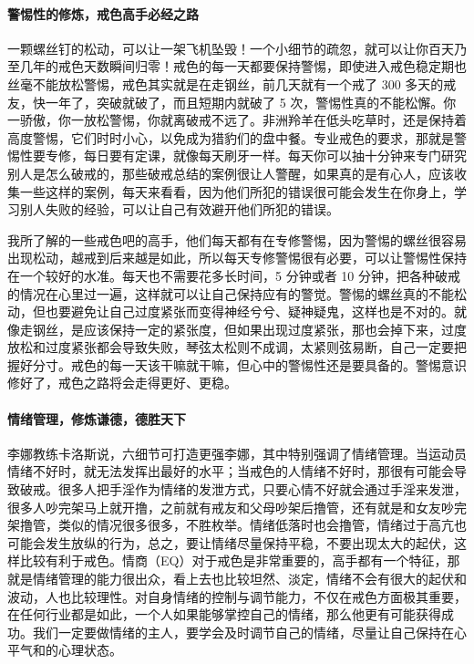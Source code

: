 \paragraph{警惕性的修炼，戒色高手必经之路}

一颗螺丝钉的松动，可以让一架飞机坠毁！一个小细节的疏忽，就可以让你百天乃至几年的戒色天数瞬间归零！戒色的每一天都要保持警惕，即使进入戒色稳定期也丝毫不能放松警惕，戒色其实就是在走钢丝，前几天就有一个戒了 300 多天的戒友，快一年了，突破就破了，而且短期内就破了 5 次，警惕性真的不能松懈。你一骄傲，你一放松警惕，你就离破戒不远了。非洲羚羊在低头吃草时，还是保持着高度警惕，它们时时小心，以免成为猎豹们的盘中餐。专业戒色的要求，那就是警惕性要专修，每日要有定课，就像每天刷牙一样。每天你可以抽十分钟来专门研究别人是怎么破戒的，那些破戒总结的案例很让人警醒，如果真的是有心人，应该收集一些这样的案例，每天来看看，因为他们所犯的错误很可能会发生在你身上，学习别人失败的经验，可以让自己有效避开他们所犯的错误。

我所了解的一些戒色吧的高手，他们每天都有在专修警惕，因为警惕的螺丝很容易出现松动，越戒到后来越是如此，所以每天专修警惕很有必要，可以让警惕性保持在一个较好的水准。每天也不需要花多长时间，5 分钟或者 10 分钟，把各种破戒的情况在心里过一遍，这样就可以让自己保持应有的警觉。警惕的螺丝真的不能松动，但也要避免让自己过度紧张而变得神经兮兮、疑神疑鬼，这样也是不对的。就像走钢丝，是应该保持一定的紧张度，但如果出现过度紧张，那也会掉下来，过度放松和过度紧张都会导致失败，琴弦太松则不成调，太紧则弦易断，自己一定要把握好分寸。戒色的每一天该干嘛就干嘛，但心中的警惕性还是要具备的。警惕意识修好了，戒色之路将会走得更好、更稳。

\paragraph{情绪管理，修炼谦德，德胜天下}

李娜教练卡洛斯说，六细节可打造更强李娜，其中特别强调了情绪管理。当运动员情绪不好时，就无法发挥出最好的水平；当戒色的人情绪不好时，那很有可能会导致破戒。很多人把手淫作为情绪的发泄方式，只要心情不好就会通过手淫来发泄，很多人吵完架马上就开撸，之前就有戒友和父母吵架后撸管，还有就是和女友吵完架撸管，类似的情况很多很多，不胜枚举。情绪低落时也会撸管，情绪过于高亢也可能会发生放纵的行为，总之，要让情绪尽量保持平稳，不要出现太大的起伏，这样比较有利于戒色。情商（EQ）对于戒色是非常重要的，高手都有一个特征，那就是情绪管理的能力很出众，看上去也比较坦然、淡定，情绪不会有很大的起伏和波动，人也比较理性。对自身情绪的控制与调节能力，不仅在戒色方面极其重要，在任何行业都是如此，一个人如果能够掌控自己的情绪，那么他更有可能获得成功。我们一定要做情绪的主人，要学会及时调节自己的情绪，尽量让自己保持在心平气和的心理状态。

